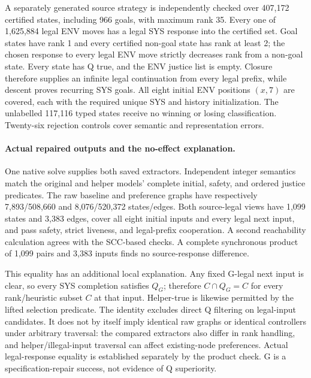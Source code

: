 A separately generated source strategy is independently checked over
407,172 certified states, including 966 goals, with maximum rank 35.
Every one of 1,625,884 legal ENV moves has a legal SYS response into
the certified set. Goal states have rank 1 and every certified non-goal
state has rank at least 2; the chosen response to every legal ENV move
strictly decreases rank from a non-goal state.
Every state has Q true, and the ENV justice list is empty. Closure
therefore supplies an infinite legal continuation from every legal
prefix, while descent proves recurring SYS goals. All eight initial
ENV positions $(x,7)$ are covered, each with the required unique SYS
and history initialization. The unlabelled 117,116 typed states receive
no winning or losing classification. Twenty-six rejection controls
cover semantic and representation errors.

\paragraph{Actual repaired outputs and the no-effect explanation.}
One native solve supplies both saved extractors. Independent integer
semantics match the original and helper models' complete initial,
safety, and ordered justice predicates. The raw baseline and preference
graphs have respectively 7,893/508,660 and 8,076/520,372 states/edges.
Both source-legal views have 1,099 states and 3,383 edges, cover all eight
initial inputs and every legal next input, and pass safety, strict
liveness, and legal-prefix cooperation. A second reachability calculation
agrees with the SCC-based checks. A complete synchronous product of
1,099 pairs and 3,383 inputs finds no source-response difference.

This equality has an additional local explanation. Any fixed G-legal
next input is clear, so every SYS completion satisfies $Q_G$; therefore
$C\cap Q_G=C$ for every rank/heuristic subset $C$ at that input.
Helper-true is likewise permitted by the lifted selection predicate.
The identity excludes direct Q filtering on legal-input candidates.
It does not by itself imply identical raw graphs or identical controllers
under arbitrary traversal: the compared extractors also differ in rank
handling, and helper/illegal-input traversal can affect existing-node
preferences. Actual legal-response equality is established separately
by the product check. G is a specification-repair success, not evidence
of Q superiority.

